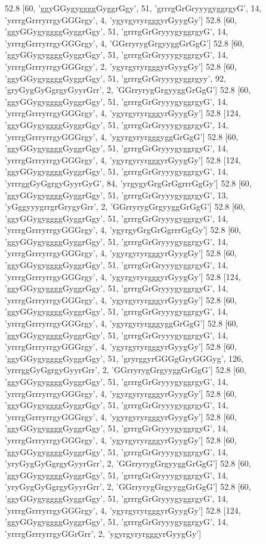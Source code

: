 52.8 [60, 'ggyGGygyggggGyggrGgy', 51, 'grrrgGrGryyygyggrgyG', 14, 'yrrrgGrrryrrgyGGGrgy', 4, 'ygyrgyryrgggyrGyygGy']
52.8 [60, 'ggyGGygyggggGyggrGgy', 51, 'grrrgGrGryyygyggrgyG', 14, 'yrrrgGrrryrrgyGGGrgy', 4, 'GGrryrygGrgyyggGrGgG']
52.8 [60, 'ggyGGygyggggGyggrGgy', 51, 'grrrgGrGryyygyggrgyG', 14, 'yrrrgGrrryrrgyGGGrgy', 2, 'ygyrgyryrgggyrGyygGy']
52.8 [60, 'ggyGGygyggggGyggrGgy', 51, 'grrrgGrGryyygyggrgyy', 92, 'gryGygGyGgrgyGyyrGrr', 2, 'GGrryrygGrgyyggGrGgG']
52.8 [60, 'ggyGGygyggggGyggrGgy', 51, 'grrrgGrGryyygyggrgyG', 14, 'yrrrgGrrryrrgyGGGrgy', 4, 'ygyrgyryrgggyrGyygGy']
52.8 [124, 'ggyGGygyggggGyggrGgy', 51, 'grrrgGrGryyygyggrgyG', 14, 'yrrrgGrrryrrgyGGGrgy', 4, 'ygyrgyryrgggyggGrGgG']
52.8 [60, 'ggyGGygyggggGyggrGgy', 51, 'grrrgGrGryyygyggrgyG', 14, 'yrrrgGrrryrrgyGGGrgy', 4, 'ygyrgyryrgggyrGyygGy']
52.8 [124, 'ggyGGygyggggGyggrGgy', 51, 'grrrgGrGryyygyggrgyG', 14, 'yrrrggGyGgrgyGyyrGyG', 84, 'yrgygyGrgGrGgrrrGgGy']
52.8 [60, 'ggyGGygyggggGyggrGgy', 51, 'grrrgGrGryyygyggrgyG', 13, 'yGggyyygrrgrGrygyGrr', 2, 'GGrryrygGrgyyggGrGgG']
52.8 [60, 'ggyGGygyggggGyggrGgy', 51, 'grrrgGrGryyygyggrgyG', 14, 'yrrrgGrrryrrgyGGGrgy', 4, 'ygyrgyGrgGrGgrrrGgGy']
52.8 [60, 'ggyGGygyggggGyggrGgy', 51, 'grrrgGrGryyygyggrgyG', 14, 'yrrrgGrrryrrgyGGGrgy', 4, 'ygyrgyryrgggyrGyygGy']
52.8 [60, 'ggyGGygyggggGyggrGgy', 51, 'grrrgGrGryyygyggrgyG', 14, 'yrrrgGrrryrrgyGGGrgy', 4, 'ygyrgyryrgggyrGyygGy']
52.8 [124, 'ggyGGygyggggGyggrGgy', 51, 'grrrgGrGryyygyggrgyG', 14, 'yrrrgGrrryrrgyGGGrgy', 4, 'ygyrgyryrgggyrGyygGy']
52.8 [60, 'ggyGGygyggggGyggrGgy', 51, 'grrrgGrGryyygyggrgyG', 14, 'yrrrgGrrryrrgyGGGrgy', 4, 'ygyrgyryrgggyggGrGgG']
52.8 [60, 'ggyGGygyggggGyggrGgy', 51, 'grrrgGrGryyygyggrgyG', 14, 'yrrrgGrrryrrgyGGGrgy', 4, 'ygyrgyryrgggyrGyygGy']
52.8 [60, 'ggyGGygyggggGyggrGgy', 51, 'gryrggyrGGGgGryGGGyg', 126, 'yrrrggGyGgrgyGyyrGrr', 2, 'GGrryrygGrgyyggGrGgG']
52.8 [60, 'ggyGGygyggggGyggrGgy', 51, 'grrrgGrGryyygyggrgyG', 14, 'yrrrgGrrryrrgyGGGrgy', 4, 'ygyrgyryrgggyrGyygGy']
52.8 [60, 'ggyGGygyggggGyggrGgy', 51, 'grrrgGrGryyygyggrgyG', 14, 'yrrrgGrrryrrgyGGGrgy', 4, 'ygyrgyryrgggyrGyygGy']
52.8 [60, 'ggyGGygyggggGyggrGgy', 51, 'grrrgGrGryyygyggrgyG', 14, 'yrrrgGrrryrrgyGGGrgy', 4, 'ygyrgyryrgggyrGyygGy']
52.8 [60, 'ggyGGygyggggGyggrGgy', 51, 'grrrgGrGryyygyggrgyG', 14, 'yryGygGyGgrgyGyyrGrr', 2, 'GGrryrygGrgyyggGrGgG']
52.8 [60, 'ggyGGygyggggGyggrGgy', 51, 'grrrgGrGryyygyggrgyG', 14, 'yryGygGyGgrgyGyyrGrr', 2, 'GGrryrygGrgyyggGrGgG']
52.8 [60, 'ggyGGygyggggGyggrGgy', 51, 'grrrgGrGryyygyggrgyG', 14, 'yrrrgGrrryrrgyGGGrgy', 4, 'ygyrgyryrgggyrGyygGy']
52.8 [124, 'ggyGGygyggggGyggrGgy', 51, 'grrrgGrGryyygyggrgyG', 14, 'yrrrgGrrryrrgyGGrGrr', 2, 'ygyrgyryrgggyrGyygGy']

